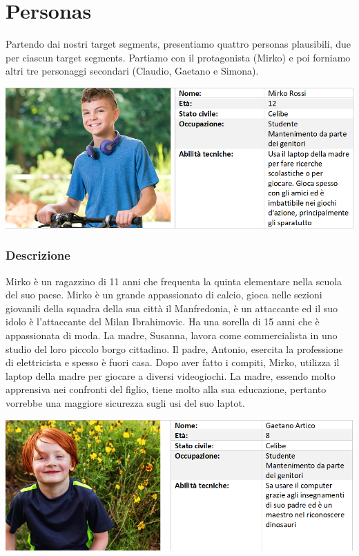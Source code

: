 \documentclass[../Report.tex]{subfiles}
\begin{document}
    \section{Personas}
    \label{section: personas}
    Partendo dai nostri target segments, presentiamo quattro personas plausibili, due per ciascun target segments. Partiamo con il protagonista (Mirko) e poi forniamo altri tre personaggi secondari (Claudio, Gaetano e Simona).\\

    \begin{center}
        \includegraphics[width=0.9\linewidth]{Tab_Mirko.png}
    \end{center}

    \subsubsection{Descrizione}
    Mirko è un ragazzino di 11 anni che frequenta la quinta elementare nella scuola del suo paese. Mirko è un grande appassionato di calcio, gioca nelle sezioni giovanili della squadra della sua città il Manfredonia, è un attaccante ed il suo idolo è l'attaccante del Milan Ibrahimovic.  Ha una sorella di 15 anni che è appassionata di moda. La madre, Susanna, lavora come commercialista in uno studio del loro piccolo borgo cittadino. Il padre, Antonio, esercita la professione di elettricista e spesso è fuori casa. Dopo aver fatto i compiti, Mirko, utilizza il laptop della madre per giocare a diversi videogiochi. La madre, essendo molto apprensiva nei confronti del figlio, tiene molto alla sua educazione, pertanto vorrebbe una maggiore sicurezza sugli usi del suo laptot.

    \vspace{1.5cm}

    \begin{center}
        \includegraphics[width=0.9\linewidth]{Tab_Gaetano.png}
    \end{center}
\end{document}
